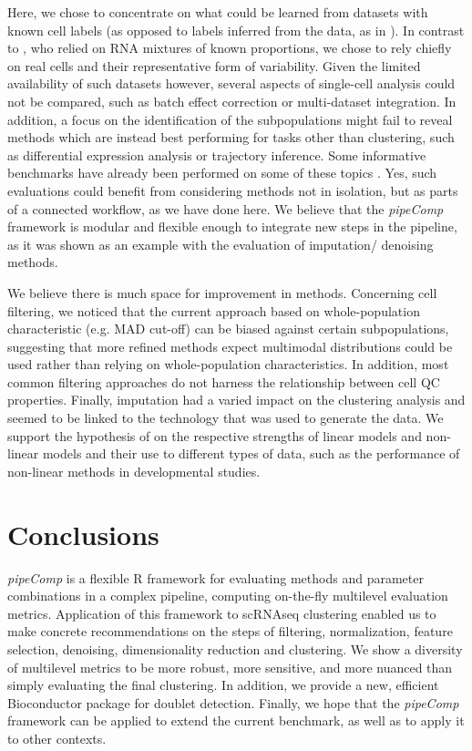\documentclass{bmcart}
\begin{document}
Here, we chose to concentrate on what could be learned from datasets with known cell labels (as opposed to labels inferred from the data, as in \citep{MereuCellAtlas2019}). In contrast to \citep{tianMixology2018}, who relied on RNA mixtures of known proportions, we chose to rely chiefly on real cells and their representative form of variability. Given the limited availability of such datasets however, several aspects of single-cell analysis could not be compared, such as batch effect correction or multi-dataset integration. In addition, a focus on the identification of the subpopulations might fail to reveal methods which are instead best performing for tasks other than clustering, such as differential expression analysis or trajectory inference. Some informative benchmarks have already been performed on some of these topics \citealp{SaelensTraject2019, SonesonDE2018}. Yes, such evaluations could benefit from considering methods not in isolation, but as parts of a connected workflow, as we have done here. We believe that the \textit{pipeComp} framework is modular and flexible enough to integrate new steps in the pipeline, as it was shown as an example with the evaluation of imputation/ denoising methods.

We believe there is much space for improvement in methods. Concerning cell filtering, we noticed that the current approach based on whole-population characteristic (e.g. MAD cut-off) can be biased against certain subpopulations, suggesting that more refined methods expect multimodal distributions could be used rather than relying on whole-population characteristics. In addition, most common filtering approaches do not harness the relationship between cell QC properties. Finally, imputation had a varied impact on the clustering analysis and seemed to be linked to the technology that was used to generate the data. We support the hypothesis of \citep{ZhangImput2018} on the respective strengths of linear models and non-linear models and their use to different types of data, such as the performance of non-linear methods in developmental studies. 

\section*{Conclusions}

\textit{pipeComp} is a flexible R framework for evaluating methods and parameter combinations in a complex pipeline, computing on-the-fly multilevel evaluation metrics. Application of this framework to scRNAseq clustering enabled us to make concrete recommendations on the steps of filtering, normalization, feature selection, denoising, dimensionality reduction and clustering. We show a diversity of multilevel metrics to be more robust, more sensitive, and more nuanced than simply evaluating the final clustering. In addition, we provide a new, efficient Bioconductor package for doublet detection. Finally, we hope that the \textit{pipeComp} framework can be applied to extend the current benchmark, as well as to apply it to other contexts.
\end{document}
